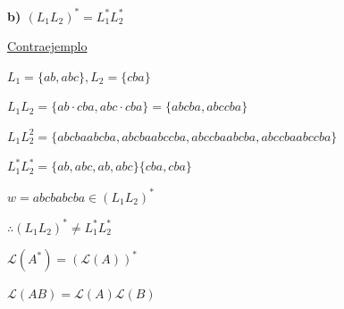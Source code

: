 \noindent\textbf{b) $(L_1 L_2)^* = L_1^* L_2^*$}

\vspace{0.2cm}
\noindent
\begin{minipage}[t]{0.62\textwidth}
\underline{Contraejemplo}

\vspace{0.25cm}
$L_1 = \{ab, abc\}, L_2 = \{cba\}$

\vspace{0.25cm}
$L_1 L_2 = \{ab \cdot cba, abc \cdot cba\} = \{abcba, abccba\}$

\vspace{0.25cm}
$L_1 L_2^{2} = \{abcbaabcba, abcbaabccba, abccbaabcba, abccbaabccba\}$

\vspace{0.25cm}
$L_1^* L_2^* = \{ab, abc, ab, abc\}\{cba, cba\}$

\vspace{0.25cm}
$w = abcbabcba \in (L_1 L_2)^*$

\vspace{0.3cm}
$\therefore (L_1 L_2)^* \neq L_1^* L_2^*$
\end{minipage}\hfill
\begin{minipage}[t]{0.35\textwidth}
\raggedleft
$\mathscr{L}(A^*) = (\mathscr{L}(A))^*$

\vspace{0.4cm}
$\mathscr{L}(AB) = \mathscr{L}(A)\mathscr{L}(B)$
\end{minipage}